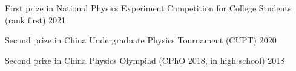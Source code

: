\documentclass[11pt]{article} %
\begin{document}
First prize in National Physics Experiment Competition for College Students  (rank first)
\hfill 2021

Second prize in China Undergraduate Physics Tournament (CUPT)
\hfill 2020

Second prize in China Physics Olympiad (CPhO 2018, in high school)
\hfill 2018






\end{document}
